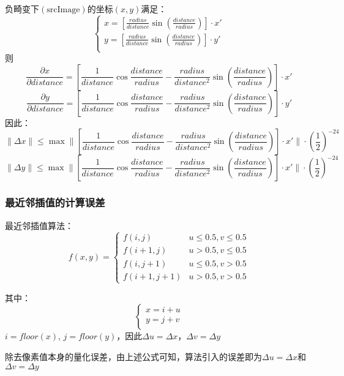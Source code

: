 \documentclass{article}
\begin{document}
\noindent 负畸变下$\mathrm{(srcImage)}$的坐标$(x,y)$满足：
\begin{equation}
	\left\{
		\begin{aligned}
			x = [\frac{radius}{distance}\sin{(\frac{distance}{radius})}] \cdot x'\\
			y = [\frac{radius}{distance}\sin{(\frac{distance}{radius})}] \cdot y'\\
		\end{aligned}
	\right.
\end{equation}
则
$$\frac{\partial x}{\partial distance} = [\frac{1}{distance}\cos{\frac{distance}{radius}} - \frac{radius}{distance^2}\sin{(\frac{distance}{radius})}] \cdot x'$$
$$\frac{\partial y}{\partial distance} = [\frac{1}{distance}\cos{\frac{distance}{radius}} - \frac{radius}{distance^2}\sin{(\frac{distance}{radius})}] \cdot y'$$
因此：
$$\| \Delta x\| \leqslant \max{\|[\frac{1}{distance}\cos{\frac{distance}{radius}} - \frac{radius}{distance^2}\sin{(\frac{distance}{radius})}] \cdot x'\|}\cdot (\frac{1}{2})^{-24}$$
$$\| \Delta y\| \leqslant \max{\|[\frac{1}{distance}\cos{\frac{distance}{radius}} - \frac{radius}{distance^2}\sin{(\frac{distance}{radius})}] \cdot x'\|}\cdot (\frac{1}{2})^{-24}$$

\subsubsection{最近邻插值的计算误差}
最近邻插值算法：
\begin{equation}
	f(x,y)=
	\begin{cases}
		f(i,j) & u \leqslant 0.5, v \leqslant 0.5\\
		f(i + 1,j) & u > 0.5, v \leqslant 0.5\\
		f(i,j + 1) & u \leqslant 0.5, v > 0.5\\
		f(i + 1,j + 1) & u > 0.5, v > 0.5
	\end{cases}
\end{equation}

其中：
\begin{equation}
	\left\{
		\begin{aligned}
			x = i + u\\
			y = j + v\\
		\end{aligned}
	\right.
\end{equation}
$i = floor(x)$, $j = floor(y)$，因此$\Delta u = \Delta x$，$\Delta v = \Delta y$

除去像素值本身的量化误差，由上述公式可知，算法引入的误差即为$\Delta u = \Delta x$和$\Delta v = \Delta y$
\end{document}
